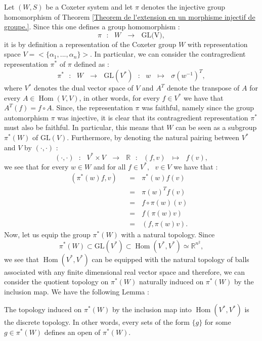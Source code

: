 \documentclass[envcountsame,envcountchap]{svmono}
\DeclareMathOperator{\Hom}{Hom}
\newcommand{\R}{\mathbb R}
\newcommand{\sub}{\subset}
\newcommand{\fct}[4]{\qq:\qq #1\qq\longrightarrow\qq #2\qq :\qq #3\qq \mapsto\qq #4}
\newcommand{\qq}{\text{ }}
\newcommand{\fctt}[2]{\qq:\qq#1\qq\rightarrow\qq#2}
\begin{document}
Let $(W,S)$ be a Coxeter system and let $\pi$ denotes the injective group homomorphism of Theorem \ref{Theorem de l'extension en un morphisme injectif de groupe.}. Since this one defines a group homomorphism :
\begin{equation}
\pi\fctt{W}{\mbox{GL(V)}},
\end{equation}
it is by definition a representation of the Coxeter group $W$ with representation space $V=<\{\alpha_1,...,\alpha_n\}>$. In particular, we can consider the contragredient representation $\pi^*$ of $\pi$ defined as :
\begin{equation}
\pi^*\fct{W}{\mbox{GL}(V^*)}{w}{\sigma(w^{-1})^T},
\end{equation}
where $V^*$ denotes the dual vector space of $V$ and $A^T$ denote the transpose of $A$ for every $A\in \Hom(V,V)$, in other words, for every $f\in V^*$ we have that $A^T(f)=f\circ A$. Since, the representation $\pi$ was faithful, namely since the group automorphism $\pi$ was injective, it is clear that its contragredient representation $\pi^*$ must also be faithful. In particular, this means that $W$ can be seen as a subgroup $\pi^*(W)$ of $\mbox{GL}(V)$. Furthermore, by denoting the natural pairing between $V^*$ and $V$ by $(\cdot,\cdot)$ :
\begin{equation}
(\cdot,\cdot)\fct{V^*\times V}{\R}{(f,v)}{f(v)},
\end{equation}
we see that for every $w\in W$ and for all $f\in V^*,\qq v\in V$ we have that :
\begin{equation}
\begin{split}
(\pi^*(w)f,v)\qq&=\qq \pi^*(w)f(v)\\
&=\qq \pi(w)^Tf(v)\qq\\
&=\qq f\circ\pi(w)(v)\qq\\
&=\qq f(\pi(w)v)\qq\\
&=\qq (f,\pi(w)v).
\end{split}
\end{equation}
Now, let us equip the group $\pi^*(W)$ with a natural topology. Since
\begin{equation}
\pi^*(W)\sub \mbox{GL}(V^*)\sub\Hom(V^*,V^*)\simeq\R^{n^2},
\end{equation} 
we see that $\Hom(V^*,V^*)$ can be equipped with the natural topology of balls associated with any finite dimensional real vector space and therefore, we can consider the quotient topology on $\pi^*(W)$ naturally induced on $\pi^*(W)$ by the inclusion map. We have the following Lemma :
\begin{lemma}
	The topology induced on $\pi^*(W)$ by the inclusion map into $\Hom(V^*,V^*)$ is the discrete topology. In other words, every sets of the form $\{g\}$ for some $g\in \pi^*(W)$ defines an open of $\pi^*(W)$.
\end{lemma}
\end{document}
